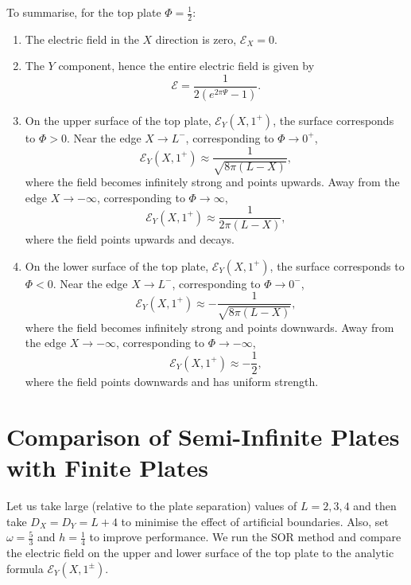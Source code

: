 \documentclass{article}
\begin{document}
To summarise, for the top plate \(\Phi = \frac{1}{2}\):
\begin{enumerate}
    \item The electric field in the \(X\) direction is zero, \(\mathcal{E}_X = 0\).
    \item The \(Y\) component, hence the entire electric field is given by
    \[ \mathcal{E} = \frac{1}{2(e^{2\pi \Psi} - 1)}. \]
    \item On the upper surface of the top plate, \(\mathcal{E}_Y(X, 1^+)\), the surface corresponds to \(\Phi > 0\). Near the edge \(X \to L^-\), corresponding to \(\Phi \to 0^+\), 
    \[ \mathcal{E}_Y(X, 1^+) \approx \frac{1}{\sqrt{8\pi(L-X)}}, \]
    where the field becomes infinitely strong and points upwards. Away from the edge \(X \to -\infty\), corresponding to \(\Phi \to \infty\),
    \[ \mathcal{E}_Y(X, 1^+) \approx \frac{1}{2\pi(L-X)}, \]
    where the field points upwards and decays.
    \item On the lower surface of the top plate, \(\mathcal{E}_Y(X, 1^+)\), the surface corresponds to \(\Phi < 0\). Near the edge \(X \to L^-\), corresponding to \(\Phi \to 0^-\), 
    \[ \mathcal{E}_Y(X, 1^+) \approx -\frac{1}{\sqrt{8\pi(L-X)}}, \]
    where the field becomes infinitely strong and points downwards. Away from the edge \(X \to -\infty\), corresponding to \(\Phi \to -\infty\),
    \[ \mathcal{E}_Y(X, 1^+) \approx -\frac{1}{2}, \]
    where the field points downwards and has uniform strength.
\end{enumerate}

\section{Comparison of Semi-Infinite Plates with Finite Plates}

Let us take large (relative to the plate separation) values of \(L = 2,3,4\) and then take \(D_X = D_Y = L + 4\) to minimise the effect of artificial boundaries. Also, set \(\omega = \frac{5}{3}\) and \(h = \frac{1}{4}\) to improve performance. We run the SOR method and compare the electric field on the upper and lower surface of the top plate to the analytic formula \(\mathcal{E}_Y(X, 1^{\pm})\).
\end{document}
